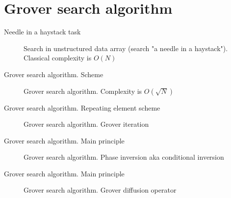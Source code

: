 \documentclass[10pt,pdf,hyperref={unicode}]{beamer}
\begin{document}
\section{Grover search algorithm}
\begin{frame}{Needle in a haystack task}
\begin{figure}
\centering



\caption{Search in unstructured data array (search "a needle in a
  haystack"). Classical complexity is $O(N)$}
\label{figQuantCompSearch}
\end{figure}
\end{frame}

\begin{frame}{Grover search algorithm. Scheme}
\begin{figure}
\centering

\scalebox{1.0}{}

\caption{Grover search algorithm. Complexity is $ O(\sqrt{N})$}
\label{figQuantCompGrover}
\end{figure}
\end{frame}

\begin{frame}{Grover search algorithm. Repeating element scheme}
\begin{figure}
\centering

\scalebox{1.0}{}

\caption{Grover search algorithm. Grover iteration}
\label{figQuantCompGrover}
\end{figure}
\end{frame}


\begin{frame}{Grover search algorithm. Main principle}
\begin{figure}
\centering

\scalebox{.9}{}

\caption{Grover search algorithm. Phase inversion aka conditional inversion}
\label{figQuantCompGroverInv}
\end{figure}
\end{frame}

\begin{frame}{Grover search algorithm. Main principle}
\begin{figure}
\centering

\scalebox{.8}{}

\caption{Grover search algorithm. Grover diffusion operator}
\label{figQuantCompGroverInvMiddle}
\end{figure}

\end{frame}
\end{document}
